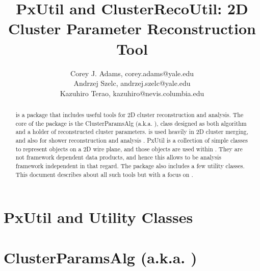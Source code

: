 \documentclass[a4paper,12pt]{report}
\begin{document}
\title{PxUtil and ClusterRecoUtil: 2D Cluster Parameter Reconstruction Tool}
\author{
  Corey J. Adams, corey.adams@yale.edu

  Andrzej Szelc, andrzej.szelc@yale.edu

  Kazuhiro Terao, kazuhiro@nevis.columbia.edu
}
\maketitle

\begin{abstract}
{\cru} is a package that includes useful tools for 2D cluster reconstruction and analysis.  The core of the package is the {\ttfamily ClusterParamsAlg} (a.k.a. {\cpan}), {\CPP} class designed as both algorithm and a holder of reconstructed cluster parameters. {\cpan} is used heavily in 2D cluster merging, and also for shower reconstruction and analysis \cite{CMTool,CMAlgo}. {\ttfamily PxUtil} is a collection of simple classes to represent objects on a 2D wire plane, and those objects are used within {\cpan}. They are not framework dependent data products, and hence this allows {\cpan} to be analysis framework independent in that regard. The package also includes a few utility classes. This document describes about all such tools but with a focus on {\cpan}.
\end{abstract}

\tableofcontents

\newpage

\chapter{{\ttfamily PxUtil} and Utility Classes}
\label{chap:util}


\chapter{{\ttfamily ClusterParamsAlg} (a.k.a. {\cpan})}
\label{chap:cpan}





\end{document}
